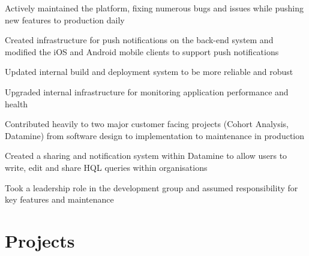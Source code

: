 \documentclass[letterpaper]{deedy-resume} %
\begin{document}
\begin{minipage}[t]{0.66\textwidth}
\sectionspace %



\begin{tightitemize}
\item Actively maintained the platform, fixing numerous bugs and issues while pushing new features to production daily
\item Created infrastructure for push notifications on the back-end system and modified the iOS and Android mobile clients to support push notifications
\item Updated internal build and deployment system to be more reliable and robust
\item Upgraded internal infrastructure for monitoring application performance and health
\end{tightitemize}

\sectionspace %



\begin{tightitemize}
\item Contributed heavily to two major customer facing projects (Cohort Analysis, Datamine) from software design to implementation to maintenance in production
\item Created a sharing and notification system within Datamine to allow users to write, edit and share HQL queries within organisations
\item Took a leadership role in the development group and assumed responsibility for key features and maintenance
\end{tightitemize}



\section{Projects}


\end{minipage}
\end{document}
